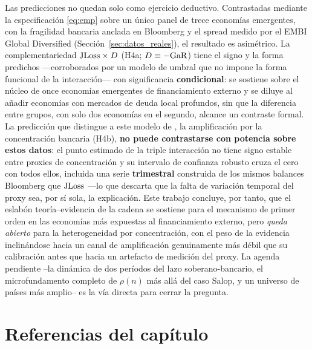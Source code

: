 Las predicciones no quedan solo como ejercicio deductivo. Contrastadas mediante la especificación \eqref{eq:emp} sobre un único panel de trece economías emergentes, con la fragilidad bancaria anclada en Bloomberg y el spread medido por el EMBI Global Diversified (Sección~\ref{sec:datos_reales}), el resultado es asimétrico. La complementariedad $\mathrm{JLoss}\times D$ (H4a; $D\equiv-\mathrm{GaR}$) tiene el signo y la forma predichos —corroborados por un modelo de umbral que no impone la forma funcional de la interacción— con significancia \textbf{condicional}: se sostiene sobre el núcleo de once economías emergentes de financiamiento externo y se diluye al añadir economías con mercados de deuda local profundos, sin que la diferencia entre grupos, con solo dos economías en el segundo, alcance un contraste formal. La predicción que distingue a este modelo de \citet{MMR2010}, la amplificación por la concentración bancaria (H4b), \textbf{no puede contrastarse con potencia sobre estos datos}: el punto estimado de la triple interacción no tiene signo estable entre proxies de concentración y su intervalo de confianza robusto cruza el cero con todos ellos, incluida una serie \textbf{trimestral} construida de los mismos balances Bloomberg que $\mathrm{JLoss}$ —lo que descarta que la falta de variación temporal del proxy sea, por sí sola, la explicación. Este trabajo concluye, por tanto, que el eslabón teoría--evidencia de la cadena se sostiene para el mecanismo de primer orden en las economías más expuestas al financiamiento externo, pero \emph{queda abierto} para la heterogeneidad por concentración, con el peso de la evidencia inclinándose hacia un canal de amplificación genuinamente más débil que su calibración antes que hacia un artefacto de medición del proxy. La agenda pendiente --la dinámica de dos períodos del lazo soberano-bancario, el microfundamento completo de $\rho(n)$ más allá del caso Salop, y un universo de países más amplio-- es la vía directa para cerrar la pregunta.

\section*{Referencias del capítulo}

